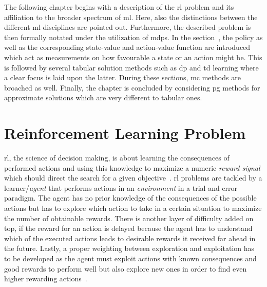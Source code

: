 \documentclass[draft,final]{vutinfth} %
\newcommand{\p}[1]{see p. #1}
\begin{document}
    The following chapter begins with a description of the \gls{rl} problem and its affiliation to the broader spectrum of \gls{ml}.
    Here, also the distinctions between the different \gls{ml} disciplines are pointed out.
    Furthermore, the described problem is then formally notated under the utilization of \glspl{mdp}.
    In the section~, the policy as well as the corresponding state-value and action-value function are introduced which act as measurements on how favourable a state or an action might be.
    This is followed by several tabular solution methods such as \gls{dp} and \gls{td} learning where a clear focus is laid upon the latter.
    During these sections, \gls{mc} methods are broached as well.
    Finally, the chapter is concluded by considering \gls{pg} methods for approximate solutions which are very different to tabular ones.


    \section{Reinforcement Learning Problem}\label{sec:reinforcement-learning-problem}
    \gls{rl}, the science of decision making, is about learning the consequences of performed actions and using this knowledge to maximize a numeric \textit{reward signal} which should direct the search for a given objective~\citep[\p{1f}]{sutton_reinforcement_2018}.
    \gls{rl} problems are tackled by a learner/\textit{agent} that performs actions in an \textit{environment} in a trial and error paradigm.
    The agent has no prior knowledge of the consequences of the possible actions but has to explore which action to take in a certain situation to maximize the number of obtainable rewards.
    There is another layer of difficulty added on top, if the reward for an action is delayed because the agent has to understand which of the executed actions leads to desirable rewards it received far ahead in the future.
    Lastly, a proper weighting between exploration and exploitation has to be developed as the agent must exploit actions with known consequences and good rewards to perform well but also explore new ones in order to find even higher rewarding actions~\citep{kaelbling_reinforcement_1996}.
\end{document}
